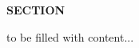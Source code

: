 \documentclass[../main.tex]{subfiles}
\begin{document}
\textbf{SECTION}

to be filled with content...
\end{document}
